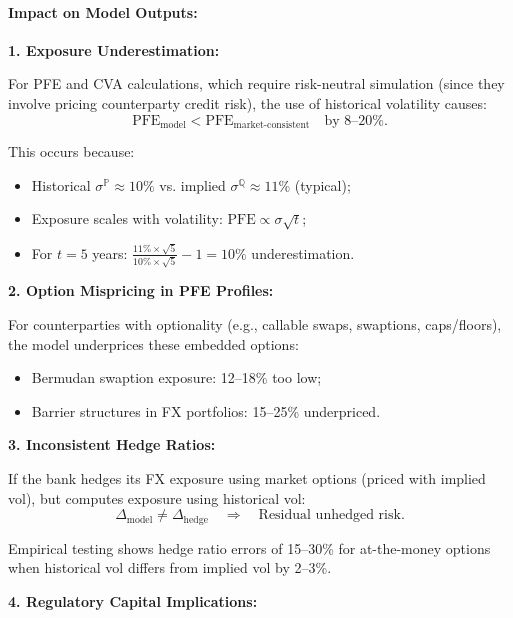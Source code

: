 \paragraph{Impact on Model Outputs:}

\textbf{1. Exposure Underestimation:}

For PFE and CVA calculations, which require risk-neutral simulation (since they involve pricing counterparty credit risk), the use of historical volatility causes:
\begin{equation}
	\text{PFE}_{\text{model}} < \text{PFE}_{\text{market-consistent}} \quad \text{by } 8\text{--}20\%.
\end{equation}

This occurs because:
\begin{itemize}
	\item Historical $\sigma^{\mathbb{P}} \approx 10\%$ vs. implied $\sigma^{\mathbb{Q}} \approx 11\%$ (typical);
	\item Exposure scales with volatility: $\text{PFE} \propto \sigma \sqrt{t}$;
	\item For $t=5$ years: $\frac{11\% \times \sqrt{5}}{10\% \times \sqrt{5}} - 1 = 10\%$ underestimation.
\end{itemize}

\textbf{2. Option Mispricing in PFE Profiles:}

For counterparties with optionality (e.g., callable swaps, swaptions, caps/floors), the model underprices these embedded options:
\begin{itemize}
	\item Bermudan swaption exposure: 12--18\% too low;
	\item Barrier structures in FX portfolios: 15--25\% underpriced.
\end{itemize}

\textbf{3. Inconsistent Hedge Ratios:}

If the bank hedges its FX exposure using market options (priced with implied vol), but computes exposure using historical vol:
\begin{equation}
	\Delta_{\text{model}} \neq \Delta_{\text{hedge}} \quad \Rightarrow \quad \text{Residual unhedged risk}.
\end{equation}

Empirical testing shows hedge ratio errors of 15--30\% for at-the-money options when historical vol differs from implied vol by 2--3\%.

\textbf{4. Regulatory Capital Implications:}

